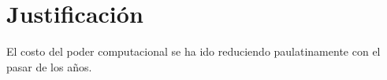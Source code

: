 \section{Justificación}

El costo del poder computacional se ha ido reduciendo paulatinamente con el pasar de los años.


